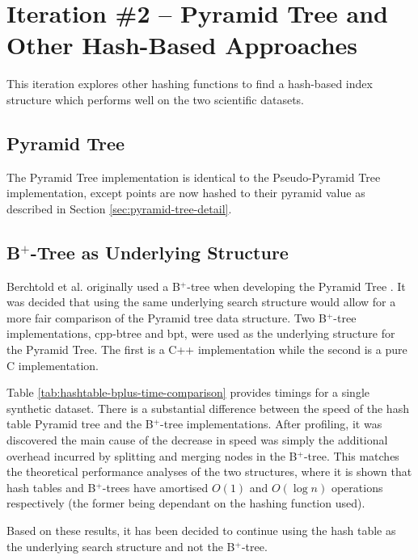 \section{Iteration \#2 -- Pyramid Tree and Other Hash-Based Approaches}

This iteration explores other hashing functions to find a hash-based index structure which performs well on the two scientific datasets.

\subsection{Pyramid Tree}

The Pyramid Tree implementation is identical to the Pseudo-Pyramid Tree implementation, except points are now hashed to their pyramid value as described in Section \ref{sec:pyramid-tree-detail}.

\subsection{B${}^+$-Tree as Underlying Structure}

Berchtold et al. originally used a B${}^{+}$-tree when developing the Pyramid Tree \cite{pyramid-tree}. It was decided that using the same underlying search structure would allow for a more fair comparison of the Pyramid tree data structure. Two B${}^{+}$-tree implementations, cpp-btree\cite{cpp-btree} and bpt\cite{bpt}, were used as the underlying structure for the Pyramid Tree. The first is a C++ implementation while the second is a pure C implementation.

Table \ref{tab:hashtable-bplus-time-comparison} provides timings for a single synthetic dataset. There is a substantial difference between the speed of the hash table Pyramid tree and the B${}^{+}$-tree implementations. After profiling, it was discovered the main cause of the decrease in speed was simply the additional overhead incurred by splitting and merging nodes in the B${}^{+}$-tree. This matches the theoretical performance analyses of the two structures, where it is shown that hash tables and B${}^{+}$-trees have amortised $O(1)$ and $O(\log n)$ operations respectively (the former being dependant on the hashing function used).

Based on these results, it has been decided to continue using the hash table as the underlying search structure and not the B${}^{+}$-tree.

